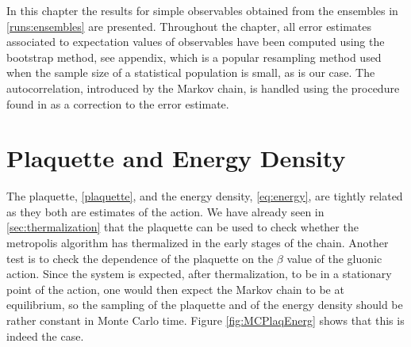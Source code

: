 In this chapter the results for simple observables obtained from the ensembles in \cref{runs:ensembles} are presented. Throughout the chapter, all error estimates associated to expectation values of observables have been computed using the bootstrap method, see \LINK appendix, which is a popular resampling method used when the sample size of a statistical population is small, as is our case. The autocorrelation, introduced by the Markov chain, is handled using the procedure found in \LINK as a correction to the error estimate.

\section{Plaquette and Energy Density} 
The plaquette, \cref{plaquette}, and the energy density, \cref{eq:energy}, are tightly related as they both are estimates of the action. We have already seen in \cref{sec:thermalization} that the plaquette can be used to check whether the metropolis algorithm has thermalized in the early stages of the chain. Another test is to check the dependence of the plaquette on the $\beta$ value of the gluonic action.
Since the system is expected, after thermalization, to be in a stationary point of the action, one would then expect the Markov chain to be at equilibrium, so the sampling of the plaquette and of the energy density should be rather constant in Monte Carlo time. Figure \ref{fig:MCPlaqEnerg} shows that this is indeed the case.
